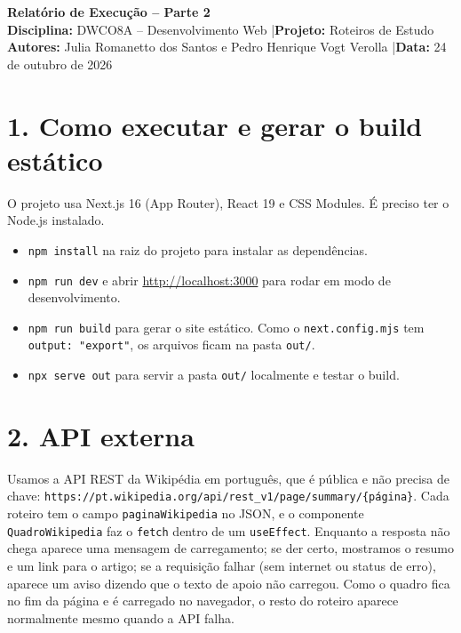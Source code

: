 \documentclass[10pt,a4paper]{article}
\begin{document}
\begin{center}
    {\large \textbf{Relatório de Execução -- Parte 2}}\\[2pt]
    \textbf{Disciplina:} DWCO8A -- Desenvolvimento Web \quad|\quad \textbf{Projeto:} Roteiros de Estudo\\
    \textbf{Autores:} Julia Romanetto dos Santos e Pedro Henrique Vogt Verolla \quad|\quad \textbf{Data:} 24 de outubro de 2026
\end{center}

\vspace{-4pt}

\section*{1. Como executar e gerar o build estático}
O projeto usa Next.js 16 (App Router), React 19 e CSS Modules. É preciso ter o Node.js instalado.
\begin{itemize}
    \item \texttt{npm install} na raiz do projeto para instalar as dependências.
    \item \texttt{npm run dev} e abrir \url{http://localhost:3000} para rodar em modo de desenvolvimento.
    \item \texttt{npm run build} para gerar o site estático. Como o \texttt{next.config.mjs} tem \texttt{output: "export"}, os arquivos ficam na pasta \texttt{out/}.
    \item \texttt{npx serve out} para servir a pasta \texttt{out/} localmente e testar o build.
\end{itemize}

\section*{2. API externa}
Usamos a API REST da Wikipédia em português, que é pública e não precisa de chave:
\texttt{https://pt.wikipedia.org/api/rest\_v1/page/summary/\{página\}}.
Cada roteiro tem o campo \texttt{paginaWikipedia} no JSON, e o componente \texttt{QuadroWikipedia} faz o \texttt{fetch} dentro de um \texttt{useEffect}. Enquanto a resposta não chega aparece uma mensagem de carregamento; se der certo, mostramos o resumo e um link para o artigo; se a requisição falhar (sem internet ou status de erro), aparece um aviso dizendo que o texto de apoio não carregou. Como o quadro fica no fim da página e é carregado no navegador, o resto do roteiro aparece normalmente mesmo quando a API falha.
\end{document}
